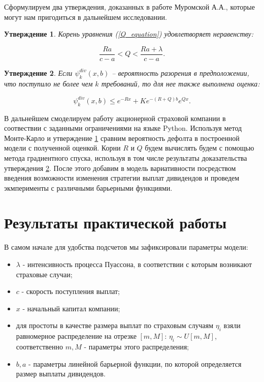 \documentclass{article}
\theoremstyle{plain}
\theoremstyle{plain}
\theoremstyle{plain}
\theoremstyle{plain}
\newtheorem{claim}{Утверждение}[section]
\theoremstyle{definition}
\theoremstyle{remark}
\begin{document}
Сформулируем два утверждения, доказанных в работе Муромской А.А., которые могут нам пригодиться в дальнейшем исследовании.

\begin{claim}
\label{claim_1}
    Корень уравнения (\ref{Q_equation}) удовлетворяет неравенству:
    
    \begin{equation}
        \frac{Ra}{c - a} < Q < \frac{Ra + \lambda}{c - a}.
    \end{equation}
\end{claim}

\begin{claim}
\label{claim_2}
    Если $\psi_k^{div}(x, b)$ -- вероятность разорения в предположении, что поступило не более чем  $k$ требований, то для нее также выполнена оценка:
    
    \begin{equation}
        \psi_k^{div}(x, b) \leq e^{-Rx} + K e^{-(R + Q)b} e^{Qx}.
    \end{equation}
\end{claim}

В дальнейшем смоделируем работу акционерной страховой компании в соотвествии с заданными ограничениями на языке Python. Используя метод Монте-Карло и утверждение \ref{claim_1} сравним вероятность дефолта в построенной модели с полученной оценкой. Корни $R$ и $Q$ будем вычислять будем с помощью метода градиентного спуска, используя в том числе результаты доказательства утверждения \ref{claim_2}. После этого добавим в модель вариативности посредством введения возможности изменения стратегии выплат дивидендов и проведем экмперименты с различными барьерными функциями.


\section{Результаты практической работы}

В самом начале для удобства подсчетов мы зафиксировали параметры модели:

\begin{itemize}
    \item $\lambda$ - интенсивность процесса Пуассона, в соответствии с которым возникают страховые случаи;
    \item $c$ - скорость поступления выплат;
    \item $x$ - начальный капитал компании;
    \item для простоты в качестве размера выплат по страховым случаям $\eta_i$ взяли равномерное распределение на отрезке $[m, M]$: $\eta_i \sim U[m, M]$, соответственно $m, M$ - параметры этого распределения;
    \item $b, a$ - параметры линейной барьерной функции, по которой определяется размер выплаты дивидендов.
\end{itemize}
\end{document}

